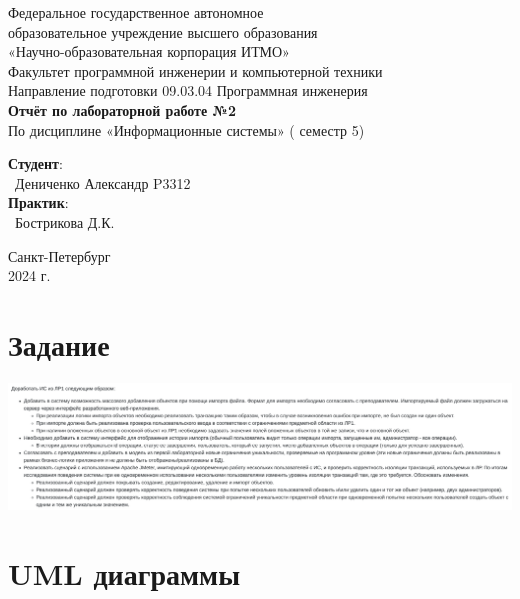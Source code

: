 \documentclass{article}
\begin{document}
\begin{center}
    \Large
    Федеральное государственное автономное \\
    образовательное учреждение высшего образования \\ 
    «Научно-образовательная корпорация ИТМО»\\
    \vspace{0.5cm}
    \large
    Факультет программной инженерии и компьютерной техники \\
    Направление подготовки 09.03.04 Программная инженерия \\
    \vspace{1cm}
    \Large
    \textbf{Отчёт по лабораторной работе №2} \\
    По дисциплине «Информационные системы» ( семестр 5)\\
    \large
    \vspace{8cm}

    \begin{minipage}{.33\textwidth}
    \end{minipage}
    \hfill
    \begin{minipage}{.4\textwidth}
    
        \textbf{Студент}: \vspace{.1cm} \\
        \ Дениченко Александр P3312\\
        \textbf{Практик}:  \\
        \ Бострикова Д.К.
    \end{minipage}
    \vfill
Санкт-Петербург\\ 2024 г.
\end{center}
\pagestyle{empty}
\newpage
\pagestyle{plain}

\section*{Задание}
\begin{center}
    \includegraphics[width=.9\textwidth]{lab2}
\end{center}


\section{UML диаграммы}
\end{document}
